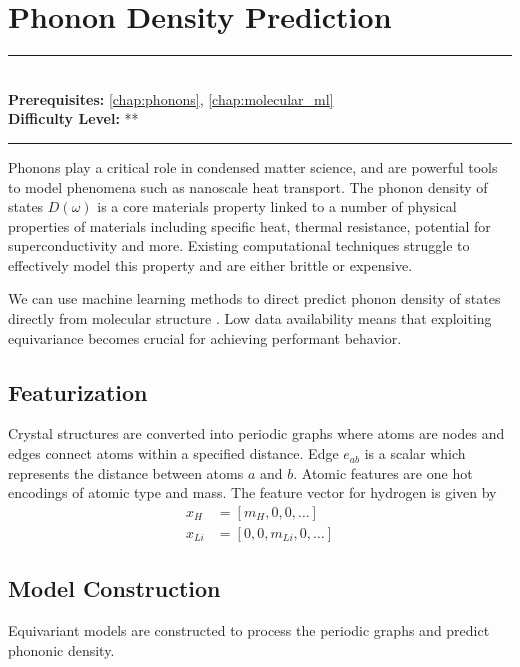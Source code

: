\documentclass[book.tex]{subfiles}
\begin{document}
\chapter{Phonon Density Prediction}
\label{chap:phonon_density}
\noindent\rule{11cm}{0.4pt} \\
\textbf{Prerequisites:} \autoref{chap:phonons}, \autoref{chap:molecular_ml}   \\
\textbf{Difficulty Level:} ** \\
\noindent\rule{11cm}{0.4pt}
\vspace{5mm}

Phonons play a critical role in condensed matter science, and are powerful tools to model phenomena such as nanoscale heat transport. The phonon density of states $D(\omega)$ is a core materials property linked to a number of physical properties of materials including specific heat, thermal resistance, potential for superconductivity and more. Existing computational techniques struggle to effectively model this property and are either brittle or expensive.

We can use machine learning methods to direct predict phonon density of states directly from molecular structure \cite{chen2021direct}. Low data availability means that exploiting equivariance becomes crucial for achieving performant behavior. 

\section{Featurization}

Crystal structures are converted into periodic graphs where atoms are nodes and edges connect atoms within a specified distance. Edge $e_{ab}$ is a scalar which represents the distance between atoms $a$ and $b$. Atomic features are one hot encodings of atomic type and mass. The feature vector for hydrogen is given by
\begin{align}
    x_H &= [m_H,0,0,\dotsc] \\
    x_{Li} &= [0, 0, m_{Li},0,\dotsc]
\end{align}

\section{Model Construction}

Equivariant models are constructed to process the periodic graphs and predict phononic density.
\end{document}
